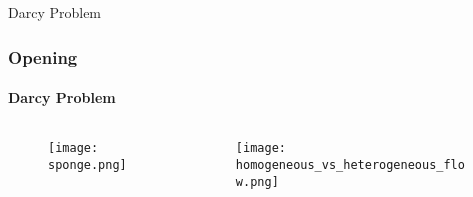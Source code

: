 \begin{frame}[label=opening]{Darcy Problem}
    \frametitle{Opening}
    \framesubtitle{Darcy Problem}
    \begin{columns}[T]
        \begin{column}{.5\textwidth}
            \begin{figure}
                \centering
                \texttt{[image: sponge.png]}
            \end{figure}
        \end{column}
        \begin{column}{.5\textwidth}
            \begin{figure}
                \centering
                \texttt{[image: homogeneous\_vs\_heterogeneous\_flow.png]}
            \end{figure}
        \end{column}
    \end{columns}
\end{frame}




